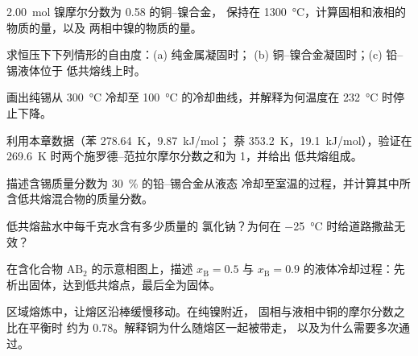 \begin{exercise}[$\star$]\label{exo:b2:solid-liquid-diagrams:2}
\qty{2.00}{mol} 镍摩尔分数为 0.58 的铜–镍合金，
保持在 \qty{1300}{\degreeCelsius}，计算固相和液相的物质的量，以及
两相中镍的物质的量。
\end{exercise}

\begin{exercise}[$\star$]\label{exo:b2:solid-liquid-diagrams:3}
求恒压下下列情形的自由度：(a) 纯金属凝固时；
(b) 铜–镍合金凝固时；(c) 铅–锡液体位于
低共熔线上时。
\end{exercise}

\begin{exercise}[$\star$]\label{exo:b2:solid-liquid-diagrams:4}
画出纯锡从 \qty{300}{\degreeCelsius} 冷却至
\qty{100}{\degreeCelsius} 的冷却曲线，并解释为何温度在
\qty{232}{\degreeCelsius} 时停止下降。
\end{exercise}

\begin{exercise}[$\star\star$]\label{exo:b2:solid-liquid-diagrams:5}
利用本章数据（苯 \qty{278.64}{K}，\qty{9.87}{kJ/mol}；
萘 \qty{353.2}{K}，\qty{19.1}{kJ/mol}），验证在
\qty{269.6}{K} 时两个施罗德–范拉尔摩尔分数之和为 1，并给出
低共熔组成。
\end{exercise}

\begin{exercise}[$\star\star$]\label{exo:b2:solid-liquid-diagrams:6}
描述含锡质量分数为 30~\% 的铅–锡合金从液态
冷却至室温的过程，并计算其中所含低共熔混合物的质量分数。
\end{exercise}

\begin{exercise}[$\star\star$]\label{exo:b2:solid-liquid-diagrams:7}
低共熔盐水中每千克水含有多少质量的
氯化钠？为何在 \qty{-25}{\degreeCelsius} 时给道路撒盐无效？
\end{exercise}

\begin{exercise}[$\star\star$]\label{exo:b2:solid-liquid-diagrams:8}
在含化合物 $\mathrm{AB_2}$ 的示意相图上，描述
$x_{\mathrm B} = 0.5$ 与 $x_{\mathrm B} = 0.9$ 的液体冷却过程：先
析出固体，达到低共熔点，最后全为固体。
\end{exercise}

\begin{exercise}[$\star\star$]\label{exo:b2:solid-liquid-diagrams:9}
区域熔炼中，让熔区沿棒缓慢移动。在纯镍附近，
固相与液相中铜的摩尔分数之比在平衡时
约为 0.78。解释铜为什么随熔区一起被带走，
以及为什么需要多次通过。
\end{exercise}

